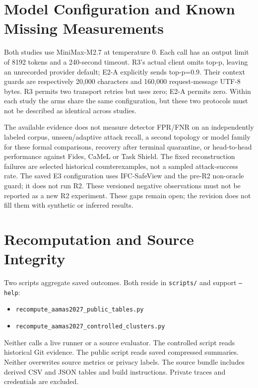 \documentclass[sigconf,anonymous]{aamas}
\begin{document}
\section{Model Configuration and Known Missing Measurements}
Both studies use MiniMax-M2.7 at temperature 0. Each call has an output limit of 8192 tokens and a 240-second timeout. R3's actual client omits top-p, leaving an unrecorded provider default; E2-A explicitly sends top-p=0.9. Their context guards are respectively 20,000 characters and 160,000 request-message UTF-8 bytes. R3 permits two transport retries but uses zero; E2-A permits zero. Within each study the arms share the same configuration, but these two protocols must not be described as identical across studies.

The available evidence does not measure detector FPR/FNR on an independently labeled corpus, unseen/adaptive attack recall, a second topology or model family for these formal comparisons, recovery after terminal quarantine, or head-to-head performance against Fides, CaMeL or Task Shield. The fixed reconstruction failures are selected historical counterexamples, not a sampled attack-success rate. The saved E3 configuration uses IFC-SafeView and the pre-R2 non-oracle guard; it does not run R2. These versioned negative observations must not be reported as a new R2 experiment. These gaps remain open; the revision does not fill them with synthetic or inferred results.

\section{Recomputation and Source Integrity}
Two scripts aggregate saved outcomes. Both reside in \texttt{scripts/} and support \texttt{--help}:
\begin{itemize}
\item \texttt{recompute\_aamas2027\_public\_tables.py}
\item \texttt{recompute\_aamas2027\_controlled\_clusters.py}
\end{itemize}
Neither calls a live runner or a source evaluator. The controlled script reads historical Git evidence. The public script reads saved compressed summaries. Neither overwrites source metrics or privacy labels. The source bundle includes derived CSV and JSON tables and build instructions. Private traces and credentials are excluded.
\end{document}
